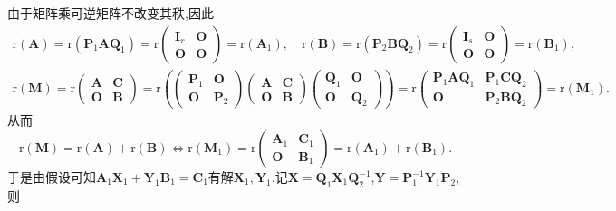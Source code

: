 \documentclass[../../main.tex]{subfiles}
\begin{document}
\begin{note}
由于矩阵乘可逆矩阵不改变其秩,因此
\begin{gather*}
\mathrm{r}(\boldsymbol{A})=\mathrm{r}(\boldsymbol{P}_1\boldsymbol{AQ}_1)=\mathrm{r}\begin{pmatrix}
\boldsymbol{I}_r & \boldsymbol{O} \\
\boldsymbol{O} & \boldsymbol{O}
\end{pmatrix}=\mathrm{r}(\boldsymbol{A}_1),\quad
\mathrm{r}(\boldsymbol{B})=\mathrm{r}(\boldsymbol{P}_2\boldsymbol{BQ}_2)=\mathrm{r}\begin{pmatrix}
\boldsymbol{I}_s & \boldsymbol{O} \\
\boldsymbol{O} & \boldsymbol{O}
\end{pmatrix}=\mathrm{r}(\boldsymbol{B}_1),
\\
\mathrm{r}(\boldsymbol{M})=\mathrm{r}\begin{pmatrix}
\boldsymbol{A} & \boldsymbol{C} \\
\boldsymbol{O} & \boldsymbol{B}
\end{pmatrix}=\mathrm{r}\left(\begin{pmatrix}
\boldsymbol{P}_1 & \boldsymbol{O} \\
\boldsymbol{O} & \boldsymbol{P}_2
\end{pmatrix}\begin{pmatrix}
\boldsymbol{A} & \boldsymbol{C} \\
\boldsymbol{O} & \boldsymbol{B}
\end{pmatrix}\begin{pmatrix}
\boldsymbol{Q}_1 & \boldsymbol{O} \\
\boldsymbol{O} & \boldsymbol{Q}_2
\end{pmatrix}\right)
=\mathrm{r}\begin{pmatrix}
\boldsymbol{P}_1\boldsymbol{AQ}_1 & \boldsymbol{P}_1\boldsymbol{CQ}_2 \\
\boldsymbol{O} & \boldsymbol{P}_2\boldsymbol{BQ}_2
\end{pmatrix}=\mathrm{r}(\boldsymbol{M}_1).
\end{gather*}
从而
\[
\mathrm{r}(\boldsymbol{M})=\mathrm{r}(\boldsymbol{A})+\mathrm{r}(\boldsymbol{B})\Leftrightarrow\mathrm{r}(\boldsymbol{M}_1)=\mathrm{r}\begin{pmatrix}
\boldsymbol{A}_1 & \boldsymbol{C}_1 \\
\boldsymbol{O} & \boldsymbol{B}_1
\end{pmatrix}=\mathrm{r}(\boldsymbol{A}_1)+\mathrm{r}(\boldsymbol{B}_1).
\]
于是由假设可知\(\boldsymbol{A}_1\boldsymbol{X}_1+\boldsymbol{Y}_1\boldsymbol{B}_1=\boldsymbol{C}_1\)有解\(\boldsymbol{X}_1,\boldsymbol{Y}_1\).记\(\boldsymbol{X}=\boldsymbol{Q}_1\boldsymbol{X}_1\boldsymbol{Q}_{2}^{-1}\),\(\boldsymbol{Y}=\boldsymbol{P}_{1}^{-1}\boldsymbol{Y}_1\boldsymbol{P}_2\),则

\end{note}
\end{document}
